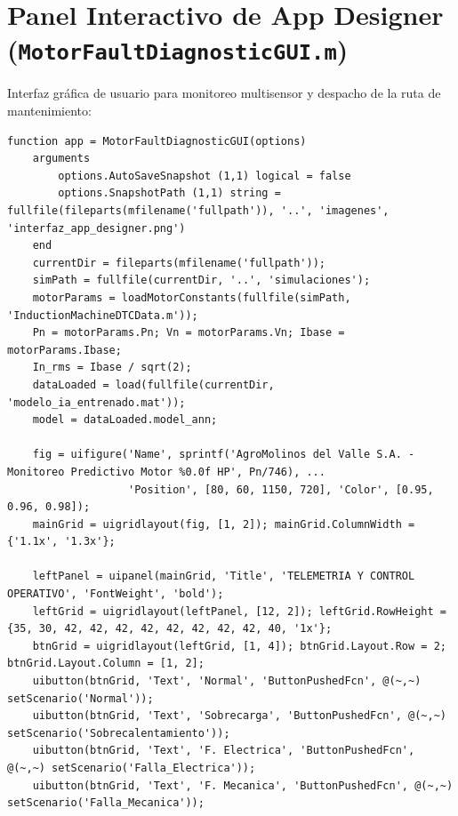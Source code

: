 \documentclass[conference]{IEEEtran}
\begin{document}
\section{Panel Interactivo de App Designer (\texttt{MotorFaultDiagnosticGUI.m})}
\label{app:gui}
Interfaz gráfica de usuario para monitoreo multisensor y despacho de la ruta de mantenimiento:
\begin{lstlisting}[caption={Panel de control y despacho predictivo (\texttt{MotorFaultDiagnosticGUI.m})}, label={lst:gui}]
function app = MotorFaultDiagnosticGUI(options)
    arguments
        options.AutoSaveSnapshot (1,1) logical = false
        options.SnapshotPath (1,1) string = fullfile(fileparts(mfilename('fullpath')), '..', 'imagenes', 'interfaz_app_designer.png')
    end
    currentDir = fileparts(mfilename('fullpath'));
    simPath = fullfile(currentDir, '..', 'simulaciones');
    motorParams = loadMotorConstants(fullfile(simPath, 'InductionMachineDTCData.m'));
    Pn = motorParams.Pn; Vn = motorParams.Vn; Ibase = motorParams.Ibase;
    In_rms = Ibase / sqrt(2);
    dataLoaded = load(fullfile(currentDir, 'modelo_ia_entrenado.mat'));
    model = dataLoaded.model_ann;

    fig = uifigure('Name', sprintf('AgroMolinos del Valle S.A. - Monitoreo Predictivo Motor %0.0f HP', Pn/746), ...
                   'Position', [80, 60, 1150, 720], 'Color', [0.95, 0.96, 0.98]);
    mainGrid = uigridlayout(fig, [1, 2]); mainGrid.ColumnWidth = {'1.1x', '1.3x'};
    
    leftPanel = uipanel(mainGrid, 'Title', 'TELEMETRIA Y CONTROL OPERATIVO', 'FontWeight', 'bold');
    leftGrid = uigridlayout(leftPanel, [12, 2]); leftGrid.RowHeight = {35, 30, 42, 42, 42, 42, 42, 42, 42, 42, 40, '1x'};
    btnGrid = uigridlayout(leftGrid, [1, 4]); btnGrid.Layout.Row = 2; btnGrid.Layout.Column = [1, 2];
    uibutton(btnGrid, 'Text', 'Normal', 'ButtonPushedFcn', @(~,~) setScenario('Normal'));
    uibutton(btnGrid, 'Text', 'Sobrecarga', 'ButtonPushedFcn', @(~,~) setScenario('Sobrecalentamiento'));
    uibutton(btnGrid, 'Text', 'F. Electrica', 'ButtonPushedFcn', @(~,~) setScenario('Falla_Electrica'));
    uibutton(btnGrid, 'Text', 'F. Mecanica', 'ButtonPushedFcn', @(~,~) setScenario('Falla_Mecanica'));


\end{lstlisting}
\end{document}
